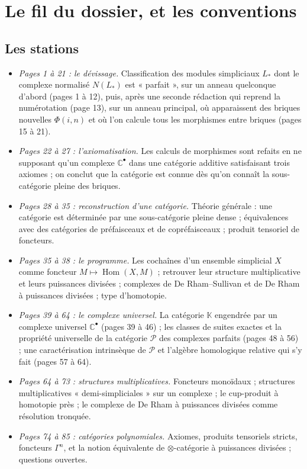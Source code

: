 \documentclass[11pt,a4paper]{article}
\begin{document}
\section*{Le fil du dossier, et les conventions}

\subsection*{Les stations}

\begin{itemize}
\item[1.] \emph{Pages 1 à 21 : le dévissage.} Classification des modules
simpliciaux $L_{*}$ dont le complexe normalisé $N(L_{*})$ est « parfait »,
sur un anneau quelconque d'abord (pages 1 à 12), puis, après une seconde
rédaction qui reprend la numérotation (page 13), sur un anneau principal, où
apparaissent des briques nouvelles $\Phi(i,n)$ et où l'on calcule tous les
morphismes entre briques (pages 15 à 21).
\item[2.] \emph{Pages 22 à 27 : l'axiomatisation.} Les calculs de morphismes
sont refaits en ne supposant qu'un complexe $\mathbb{C}^{\bullet}$ dans une
catégorie additive satisfaisant trois axiomes ; on conclut que la catégorie
est connue dès qu'on connaît la sous-catégorie pleine des briques.
\item[3.] \emph{Pages 28 à 35 : reconstruction d'une catégorie.} Théorie
générale : une catégorie est déterminée par une sous-catégorie pleine dense ;
équivalences avec des catégories de préfaisceaux et de copréfaisceaux ;
produit tensoriel de foncteurs.
\item[4.] \emph{Pages 35 à 38 : le programme.} Les cochaînes d'un ensemble
simplicial $X$ comme foncteur $M \mapsto \operatorname{Hom}(X, M)$ ;
retrouver leur structure multiplicative et leurs puissances divisées ;
complexes de De Rham–Sullivan et de De Rham à puissances divisées ; type
d'homotopie.
\item[5.] \emph{Pages 39 à 64 : le complexe universel.} La catégorie
$\mathbb{K}$ engendrée par un complexe universel $\mathbb{C}^{\bullet}$
(pages 39 à 46) ; les classes de suites exactes et la propriété universelle
de la catégorie $\mathcal{P}$ des complexes parfaits (pages 48 à 56) ; une
caractérisation intrinsèque de $\mathcal{P}$ et l'algèbre homologique
relative qui s'y fait (pages 57 à 64).
\item[6.] \emph{Pages 64 à 73 : structures multiplicatives.} Foncteurs
monoïdaux ; structures multiplicatives « demi-simpliciales » sur un complexe ;
le cup-produit à homotopie près ; le complexe de De Rham à puissances
divisées comme résolution tronquée.
\item[7.] \emph{Pages 74 à 85 : catégories polynomiales.} Axiomes, produits
tensoriels stricts, foncteurs $\Gamma^{n}$, et la notion équivalente de
$\otimes$-catégorie à puissances divisées ; questions ouvertes.
\end{itemize}
\end{document}
